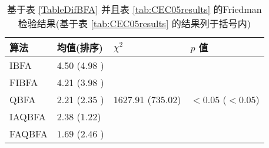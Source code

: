 \begin{table}[tb]
\begin{center}
\caption{基于表 \ref{TableDifBFA} 并且表  \ref{tab:CEC05results} 的Friedman检验结果(基于表 \ref{tab:CEC05results} 的结果列于括号内)}
\vspace{0.5em}\centering
\begin{tabularx}{0.62\textwidth}{p{}p{2.5cm}p{2.5cm}p{2.5cm}}
\hline
算法    & 均值(排序) &$\chi^2$   &$p$ 值\\
\midrule
IBFA &4.50 (4.98 )
&\multirow{6}{2.5cm}{1627.91 (735.02) }
&\multirow{6}{2.5cm}{$<0.05$ ($<0.05$)}\\
  FIBFA&4.21 (3.98 ) \\
  QBFA& 2.21 (2.35 )  \\
  IAQBFA &2.38 ($\bm{1.22}$) \\
FAQBFA& $\bm{1.69}$ (2.46 ) \\
\hline
\end{tabularx}
\label{Friedman_test2}
\end{center}
\vspace{-0.4cm}
\end{table}
